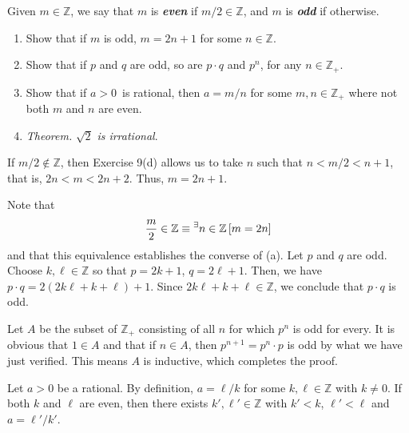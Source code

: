 \documentclass[a4paper,12pt]{article}
\begin{document}
\begin{exe}
	Given \( m \in \mathbb{Z} \),
	we say that \( m \) is \textbf{\textit{even}} if \( m/2 \in \mathbb{Z} \),
	and \( m \) is \textbf{\textit{odd}} if otherwise.
	
	\begin{enumerate}
		\item
		      Show that if \( m \) is odd,
		      \( m=2n+1 \) for some \( n\in \mathbb{Z} \).
		      
		\item
		      Show that if \( p \) and \( q \) are odd, so are \( p \cdot q \) and \( p^n \),
		      for any \( n \in \mathbb{Z}_{+} \).
		      
		\item
		      Show that if \( a>0 \)\ is rational,
		      then \( a=m/n \) for some \( m,n \in \mathbb{Z}_{+} \)
		      where not both \( m \) and \( n \) are even.
		      
		\item
		      \textit{Theorem.}\;
		      \( \sqrt{2} \) \textit{is irrational}.
	\end{enumerate}
\end{exe}\begin{sol}\leavevmode \par
	If
	\( m/2 \notin \mathbb{Z} \),
	then Exercise 9(d) allows us to take
	\( n \) such that
	\( n < m/2 <n+1 \),
	that is,
	\( 2n < m <2n+2 \).
	Thus,
	\( m=2n+1 \).
	
	Note that
	\begin{equation*}
		\frac{m}{2}\in \mathbb{Z}
		\equiv
		{}^{\exists} n \in \mathbb{Z}
		\left[ m=2n \right]
	\end{equation*}
	and that this equivalence establishes the converse of (a).
	Let
	\( p \)
	and
	\( q \)
	are odd.
	Choose
	\( k,\ell \in \mathbb{Z}\)
	so that
	\( p=2k+1 \),
	\( q=2\ell +1 \).
	Then, we have
	\( p \cdot q = 2(2k \ell + k + \ell) +1 \).
	Since 
	\( 2k \ell + k + \ell \in \mathbb{Z} \),
	we conclude that
	\( p \cdot q \)
	is odd.
	
	Let \( A \) be the subset of \( \mathbb{Z}_{+} \) consisting of all \( n \)
	for which
	\( p^n \)
	is odd for every.
	It is obvious that
	\( 1 \in A \)
	and that if
	\( n \in A \),
	then
	\( p^{n+1}=p^n \cdot p \)
	is odd by what we have just verified.
	This means \( A \) is inductive, which completes the proof.
	
	Let 
	\( a>0 \)
	be a rational.
	By definition,
	\( a=\ell /k \)
	for some
	\( k, \ell \in \mathbb{Z} \)
	with
	\( k \neq 0 \).
	If both
	\( k\)
	and
	\( \ell \)
	are even,
	then there exists 
	\( k',\ell' \in \mathbb{Z}\)
	with
	\( k'<k \),
	\( \ell' < \ell \)
	and
	\( a={\ell'}/{k'} \).
	

\end{sol}
\end{document}
